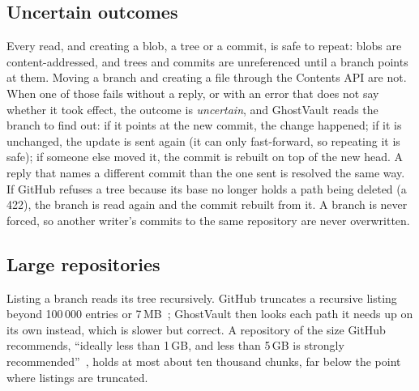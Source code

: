 \subsection{Uncertain outcomes}\label{sec:uncertain}
Every read, and creating a blob, a tree or a commit, is safe to repeat: blobs are content-addressed,
and trees and commits are unreferenced until a branch points at them. Moving a branch and creating a
file through the Contents API are not. When one of those fails without a reply, or with an error
that does not say whether it took effect, the outcome is \emph{uncertain}, and GhostVault reads the
branch to find out: if it points at the new commit, the change happened; if it is unchanged, the
update is sent again (it can only fast-forward, so repeating it is safe); if someone else moved it,
the commit is rebuilt on top of the new head. A reply that names a different commit than the one
sent is resolved the same way. If GitHub refuses a tree because its base no longer holds a path being
deleted (a 422), the branch is read again and the commit rebuilt from it. A branch is never forced,
so another writer's commits to the same repository are never overwritten.

\subsection{Large repositories}
Listing a branch reads its tree recursively. GitHub truncates a recursive listing beyond 100\,000
entries or 7\,MB~\cite{gh-git}; GhostVault then looks each path it needs up on its own instead, which
is slower but correct. A repository of the size GitHub recommends, ``ideally less than 1\,GB, and
less than 5\,GB is strongly recommended''~\cite{gh-large}, holds at most about ten thousand chunks,
far below the point where listings are truncated.
